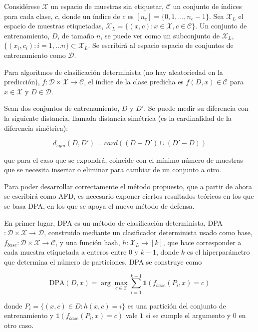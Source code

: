 Considérese $\mathcal{X}$ un espacio de muestras sin etiquetar, $\mathcal{C}$ un conjunto de índices para cada clase, $c$, donde un índice de $c$ es $[n_c] = \{0,1,...,n_c - 1\}$. Sea $\mathcal{X}_L$ el espacio de muestras etiquetadas, $\mathcal{X}_L = \{(x,c): x \in \mathcal{X}, c \in \mathcal{C}\}$. Un conjunto de entrenamiento, $D$, de tamaño $n$, se puede ver como un subconjunto de $\mathcal{X}_L$, $\{(x_i,c_i): i=1,...n\} \subset \mathcal{X}_L$. Se escribirá al espacio espacio de conjuntos de entrenamiento como $\mathcal{D}$.

Para algoritmos de clasificación determinista (no hay aleatoriedad en la predicción), $f: \mathcal{D} \times \mathcal{X} \to \mathcal{C}$, el índice de la clase predicha es $f(D,x) \in \mathcal{C}$ para $x \in \mathcal{X}$ y $D \in \mathcal{D}$.

Sean dos conjuntos de entrenamiento, $D$ y $D'$. Se puede medir su diferencia con la siguiente distancia, llamada distancia simétrica (es la cardinalidad de la diferencia simétrica):

$$d_{sym} (D,D') = card((D - D') \cup (D' - D))$$

que para el caso que se expondrá, coincide con el mínimo número de muestras que se necesita insertar o eliminar para cambiar de un conjunto a otro.

Para poder desarrollar correctamente el método propuesto, que a partir de ahora se escribirá como AFD, es necesario exponer ciertos resultados teóricos en los que se basa DPA, en los que se apoya el nuevo método de defensa.

En primer lugar, DPA es un método de clasificación determinista, DPA$: \mathcal{D} \times \mathcal{X} \to \mathcal{D}$, construido mediante un clasificador determinista usado como base, $f_{base}: \mathcal{D} \times \mathcal{X} \to \mathcal{C}$, y una función hash, $h: \mathcal{X}_L \to [k]$, que hace corresponder a cada muestra etiquetada a enteros entre $0$ y $k-1$, donde $k$ es el hiperparámetro que determina el número de particiones. DPA se construye como

$$\text{DPA}(D,x) = \arg \max_{c \in \mathcal{C}} \sum_{i=1}^{k-1} \mathbb{1} \left( f_{base}(P_i,x) = c \right)$$

donde $P_i = \{(x,c) \in D : h(x,c)=i\}$ es una partición del conjunto de entrenamiento y $\mathbb{1} \left( f_{base}(P_i,x) = c \right)$ vale $1$ si se cumple el argumento y $0$ en otro caso.%

